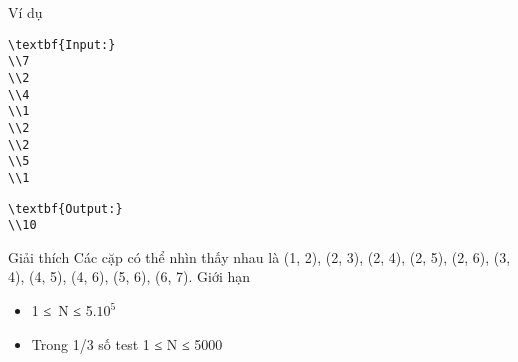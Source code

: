 Ví dụ
\begin{verbatim}
\textbf{Input:}
\\7
\\2
\\4
\\1
\\2
\\2
\\5
\\1 \end{verbatim}
\begin{verbatim}
\textbf{Output:}
\\10\end{verbatim}
Giải thích
Các cặp có thể nhìn thấy nhau là (1, 2), (2, 3), (2, 4), (2, 5), (2, 6), (3, 4), (4, 5), (4, 6), (5, 6), (6, 7).
Giới hạn
\begin{itemize}
	\item     1 ≤ N ≤ 5.$10^{5}$
	\item     Trong 1/3 số test 1 ≤ N ≤ 5000   
\end{itemize}